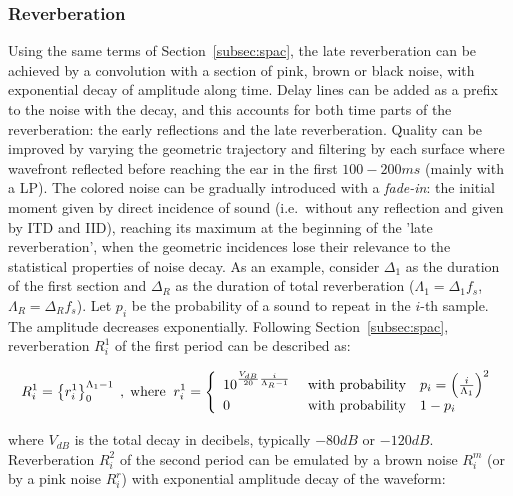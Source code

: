 \subsubsection{Reverberation}\label{subsubsec:reverb}
Using the same terms of Section~\ref{subsec:spac}, the
late reverberation can be achieved by a convolution with a section of pink, brown or black noise, with exponential decay of amplitude along time. Delay lines can be added as a prefix to the noise
with the decay, and this accounts for both time parts of the reverberation: the early reflections and the late reverberation. Quality can be improved by varying the geometric trajectory and filtering by each surface where wavefront reflected before reaching the ear in the first $100-200ms$ (mainly with a LP). The colored noise can be gradually introduced with a \emph{fade-in}: the initial moment given by direct
incidence of sound (i.e.\ without any reflection and given by ITD and IID), reaching its maximum at the beginning of the 'late
reverberation', when the geometric incidences lose their relevance to the statistical properties of noise decay. As an example, consider $\Delta_1$ as the duration of the first section and $\Delta_R$ as the duration of total reverberation ($\Lambda_1=\Delta_1 f_s$, $\Lambda_R=\Delta_R
f_s$). Let $p_i$ be the probability of a sound to repeat in the
$i$-th sample. The amplitude decreases exponentially. Following
Section~\ref{subsec:spac}, reverberation $R_i^1$ of the first period can be described as:

\begin{equation}\label{eq:p1rev}
\begin{split}
	R_i^1  =\left\{r_i^1\right\}_0^{\Lambda_1-1}\;,\; \text{where}\;\;
	r_i^1  =\left\{
        \begin{array}{l l}
            10^{\frac{V_{dB}}{20}\frac{i}{\Lambda_R-1}}\;  & \text{with probability}\quad p_i=\left(\frac{i}{\Lambda_1}\right)^2 \\
                                     0 \; & \text{with probability}\quad 1-p_i \\
        \end{array} \right.
\end{split}
\end{equation}

\noindent where $V_{dB}$ is the total decay in decibels, typically $-80dB$ or $-120dB$. Reverberation $R_i^2$ of the second period can be emulated by a brown noise $R_i^m$ (or by a pink noise $R_i^r$) with exponential amplitude decay of the waveform:

